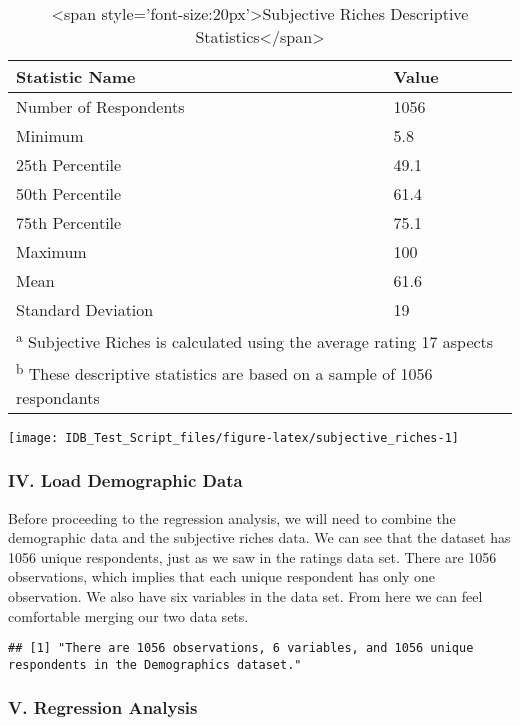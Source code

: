\documentclass[
]{article}
\begin{document}
\begin{wraptable}{l}{0pt}

\caption{\label{tab:subjective_riches}<span style='font-size:20px'>Subjective Riches Descriptive Statistics</span>}
\centering
\begin{tabular}[t]{l|l}
\hline
Statistic Name & Value\\
\hline
Number of Respondents & 1056\\
\hline
Minimum & 5.8\\
\hline
25th Percentile & 49.1\\
\hline
50th Percentile & 61.4\\
\hline
75th Percentile & 75.1\\
\hline
Maximum & 100\\
\hline
Mean & 61.6\\
\hline
Standard Deviation & 19\\
\hline
\multicolumn{2}{l}{\rule{0pt}{1em}\textsuperscript{a} Subjective Riches is calculated using the average rating  17 aspects}\\
\multicolumn{2}{l}{\rule{0pt}{1em}\textsuperscript{b} These descriptive statistics are based on a sample of 1056 respondants}\\
\end{tabular}
\end{wraptable}

\texttt{[image: IDB\_Test\_Script\_files/figure-latex/subjective\_riches-1]}

\hypertarget{iv.-load-demographic-data}{%
\subsubsection{IV. Load Demographic
Data}\label{iv.-load-demographic-data}}

Before proceeding to the regression analysis, we will need to combine
the demographic data and the subjective riches data. We can see that the
dataset has 1056 unique respondents, just as we saw in the ratings data
set. There are 1056 observations, which implies that each unique
respondent has only one observation. We also have six variables in the
data set. From here we can feel comfortable merging our two data sets.

\begin{verbatim}
## [1] "There are 1056 observations, 6 variables, and 1056 unique respondents in the Demographics dataset."
\end{verbatim}

\hypertarget{v.-regression-analysis}{%
\subsubsection{V. Regression Analysis}\label{v.-regression-analysis}}
\end{document}
